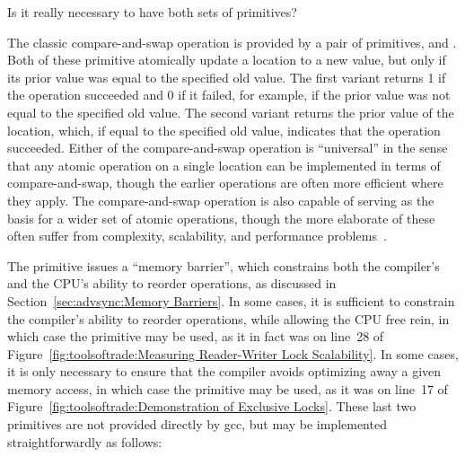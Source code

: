\QuickQuiz{}
	Is it really necessary to have both sets of primitives?
 \QuickQuizEnd

The classic compare-and-swap operation is provided by a pair of
primitives,  and
.
Both of these primitive atomically update a location to a new value,
but only if its prior value was equal to the specified old value.
The first variant returns 1 if the operation succeeded and 0 if it
failed, for example, if the prior value was not equal to the specified
old value.
The second variant returns the prior value of the location, which, if
equal to the specified old value, indicates that the operation succeeded.
Either of the compare-and-swap operation is ``universal'' in the sense
that any atomic operation on a single location can be implemented in
terms of compare-and-swap, though the earlier operations are often
more efficient where they apply.
The compare-and-swap operation is also capable of serving as the basis
for a wider set of atomic operations, though the more elaborate of
these often suffer from complexity, scalability, and performance
problems~\cite{MauriceHerlihy90a}.

The  primitive issues a ``memory barrier'',
which constrains both the compiler's and the CPU's ability to reorder
operations, as discussed in Section~\ref{sec:advsync:Memory Barriers}.
In some cases, it is sufficient to constrain the compiler's ability
to reorder operations, while allowing the CPU free rein, in which
case the  primitive may be used, as it in fact was
on line~28 of
Figure~\ref{fig:toolsoftrade:Measuring Reader-Writer Lock Scalability}.
In some cases, it is only necessary to ensure that the compiler
avoids optimizing away a given memory access, in which case the
 primitive may be used, as it was on line~17 of
Figure~\ref{fig:toolsoftrade:Demonstration of Exclusive Locks}.
These last two primitives are not provided directly by gcc,
but may be implemented straightforwardly as follows:

